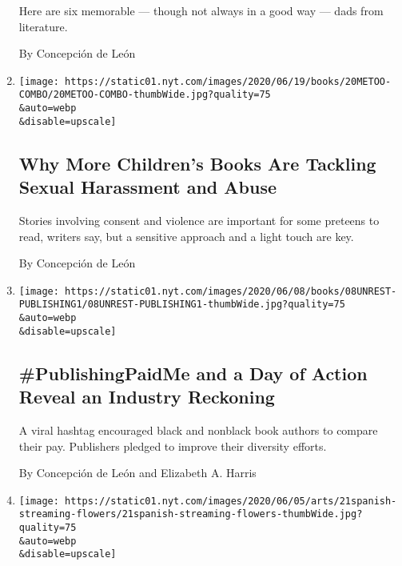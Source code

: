 \begin{enumerate}
  Here are six memorable --- though not always in a good way --- dads
  from literature.

  By Concepción de León
\item
  \href{/2020/06/17/books/childrens-books-middle-grade-metoo-sexual-abuse.html}{}

  \texttt{[image: https://static01.nyt.com/images/2020/06/19/books/20METOO-COMBO/20METOO-COMBO-thumbWide.jpg?quality=75\\\&auto=webp\\\&disable=upscale]}

  \hypertarget{why-more-childrens-books-are-tackling-sexual-harassment-and-abuse}{%
  \subsection{Why More Children's Books Are Tackling Sexual Harassment
  and
  Abuse}\label{why-more-childrens-books-are-tackling-sexual-harassment-and-abuse}}

  Stories involving consent and violence are important for some preteens
  to read, writers say, but a sensitive approach and a light touch are
  key.

  By Concepción de León
\item
  \href{/2020/06/08/books/publishingpaidme-publishing-day-of-action.html}{}

  \texttt{[image: https://static01.nyt.com/images/2020/06/08/books/08UNREST-PUBLISHING1/08UNREST-PUBLISHING1-thumbWide.jpg?quality=75\\\&auto=webp\\\&disable=upscale]}

  \hypertarget{publishingpaidme-and-a-day-of-action-reveal-an-industry-reckoning}{%
  \subsection{\#PublishingPaidMe and a Day of Action Reveal an Industry
  Reckoning}\label{publishingpaidme-and-a-day-of-action-reveal-an-industry-reckoning}}

  A viral hashtag encouraged black and nonblack book authors to compare
  their pay. Publishers pledged to improve their diversity efforts.

  By Concepción de León and Elizabeth A. Harris
\item
  \href{/2020/06/04/arts/television/shows-to-stream-from-latin-america.html}{}

  \texttt{[image: https://static01.nyt.com/images/2020/06/05/arts/21spanish-streaming-flowers/21spanish-streaming-flowers-thumbWide.jpg?quality=75\\\&auto=webp\\\&disable=upscale]}


\end{enumerate}
